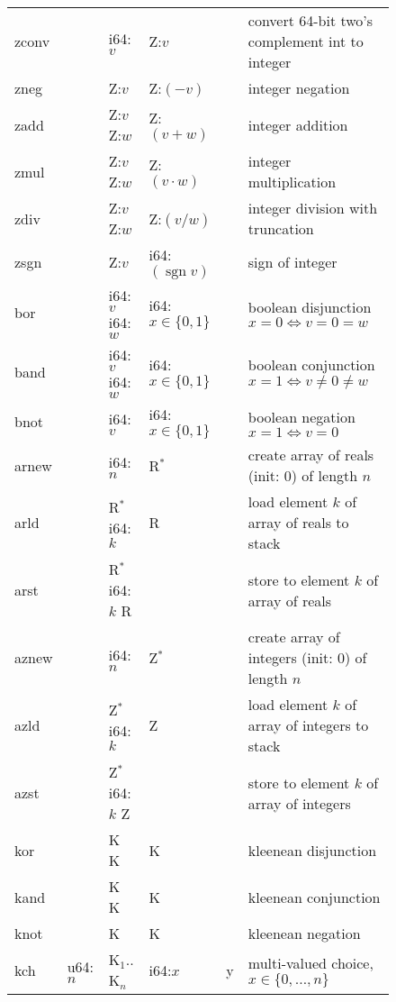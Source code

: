 \documentclass[a4paper,parskip=half]{scrartcl}
\begin{document}
\begin{figure}[h]
\begin{tabular}{l|l|l|l@{\;\,\vline\,}c@{\,\vline\;\,}l}
  \hline
  \ttfamily zconv &         & i64:$v$         & Z:$v$            && convert 64-bit two's complement int to integer \\
  \ttfamily zneg  &         & Z:$v$           & Z:$(-v)$         && integer negation \\
  \ttfamily zadd  &         & Z:$v$ Z:$w$     & Z:$(v+w)$        && integer addition \\
  \ttfamily zmul  &         & Z:$v$ Z:$w$     & Z:$(v\cdot w)$   && integer multiplication \\
  \ttfamily zdiv  &         & Z:$v$ Z:$w$     & Z:$(v/w)$        && integer division with truncation \\
  \ttfamily zsgn  &         & Z:$v$           & i64:$(\operatorname{sgn}v)$ && sign of integer \\
  \hline
  \ttfamily bor   &         & i64:$v$ i64:$w$ & i64:$x\in\{0,1\}$ && boolean disjunction $x=0\iff v=0=w$ \\
  \ttfamily band  &         & i64:$v$ i64:$w$ & i64:$x\in\{0,1\}$ && boolean conjunction $x=1\iff v\neq0\neq w$ \\
  \ttfamily bnot  &         & i64:$v$         & i64:$x\in\{0,1\}$ && boolean negation $x=1\iff v=0$ \\
  \hline
  \ttfamily arnew &         & i64:$n$         & R$^*$ && create array of reals (init: 0) of length $n$ \\
  \ttfamily arld  &         & R$^*$ i64:$k$   & R     && load element $k$ of array of reals to stack \\
  \ttfamily arst  &         & R$^*$ i64:$k$ R &       && store to element $k$ of array of reals \\
  \hline
  \ttfamily aznew &         & i64:$n$         & Z$^*$ && create array of integers (init: 0) of length $n$ \\
  \ttfamily azld  &         & Z$^*$ i64:$k$   & Z     && load element $k$ of array of integers to stack \\
  \ttfamily azst  &         & Z$^*$ i64:$k$ Z &       && store to element $k$ of array of integers \\
  \hline
  \ttfamily kor   &         & K K               & K && kleenean disjunction \\
  \ttfamily kand  &         & K K               & K && kleenean conjunction \\
  \ttfamily knot  &         & K                 & K && kleenean negation \\
  \ttfamily kch   & u64:$n$ & K$_1..$K$_n$ & i64:$x$ & y & multi-valued choice, $x\in\{0,\ldots,n\}$ \\

\end{tabular}
\end{figure}
\end{document}
